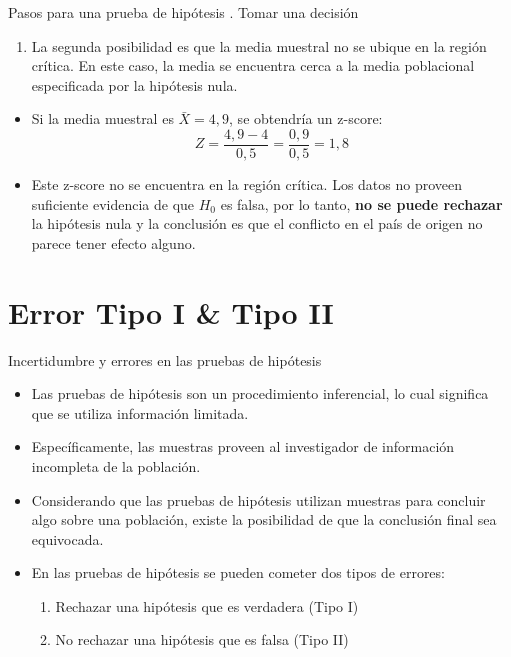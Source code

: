 \documentclass{beamer}
\newcounter{saveenumi}
\newcommand{\conti}{\setcounter{enumi}{\value{saveenumi}}}
\begin{document}
\begin{frame}{Pasos para una prueba de hipótesis}
	{. Tomar una decisión}
	\begin{enumerate}
		\conti
		\justifying
\item La segunda posibilidad es que la media muestral no se ubique en la región crítica. En este caso, la media se encuentra cerca a la media poblacional especificada por la hipótesis nula. 
	\end{enumerate}
\begin{itemize}
\justifying
\item Si la media muestral es $\bar{X}=4,9$, se obtendría un z-score:
$$Z=\dfrac{4,9-4}{0,5}=\dfrac{0,9}{0,5}=1,8$$
\item Este z-score no se encuentra en la región crítica. Los datos no proveen suficiente evidencia de que $H_0$ es falsa, por lo tanto, {\bf no se puede rechazar} la hipótesis nula y la conclusión es que el conflicto en el país de origen no parece tener efecto alguno.
\end{itemize}

\end{frame}

\section{Error Tipo I \& Tipo II}
\begin{frame}{Incertidumbre y errores en las pruebas de hipótesis}
\begin{itemize}
\justifying
\item Las pruebas de hipótesis son un procedimiento inferencial, lo cual significa que se utiliza información limitada.
\item Específicamente, las muestras proveen al investigador de información incompleta de la población. 
\item Considerando que las pruebas de hipótesis utilizan muestras para concluir algo sobre una población, existe la posibilidad de que la conclusión final sea equivocada.
\item En las pruebas de hipótesis se pueden cometer dos tipos de errores:
\begin{enumerate}
\item Rechazar una hipótesis que es verdadera (Tipo I)
\item No rechazar una hipótesis que es falsa (Tipo II)
\end{enumerate}
\end{itemize}
\end{frame}
\end{document}
